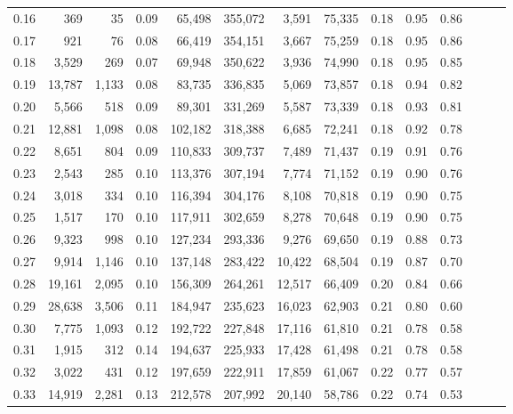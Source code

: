 \begin{tabular}{rrrrrrrrrrrrrr}
0.16 &     369 &     35 &  0.09 &   65,498 &  355,072 &   3,591 &  75,335 &  0.18 &  0.95 &      0.86 \\
0.17 &     921 &     76 &  0.08 &   66,419 &  354,151 &   3,667 &  75,259 &  0.18 &  0.95 &      0.86 \\
0.18 &   3,529 &    269 &  0.07 &   69,948 &  350,622 &   3,936 &  74,990 &  0.18 &  0.95 &      0.85 \\
0.19 &  13,787 &  1,133 &  0.08 &   83,735 &  336,835 &   5,069 &  73,857 &  0.18 &  0.94 &      0.82 \\
0.20 &   5,566 &    518 &  0.09 &   89,301 &  331,269 &   5,587 &  73,339 &  0.18 &  0.93 &      0.81 \\
0.21 &  12,881 &  1,098 &  0.08 &  102,182 &  318,388 &   6,685 &  72,241 &  0.18 &  0.92 &      0.78 \\
0.22 &   8,651 &    804 &  0.09 &  110,833 &  309,737 &   7,489 &  71,437 &  0.19 &  0.91 &      0.76 \\
0.23 &   2,543 &    285 &  0.10 &  113,376 &  307,194 &   7,774 &  71,152 &  0.19 &  0.90 &      0.76 \\
0.24 &   3,018 &    334 &  0.10 &  116,394 &  304,176 &   8,108 &  70,818 &  0.19 &  0.90 &      0.75 \\
0.25 &   1,517 &    170 &  0.10 &  117,911 &  302,659 &   8,278 &  70,648 &  0.19 &  0.90 &      0.75 \\
0.26 &   9,323 &    998 &  0.10 &  127,234 &  293,336 &   9,276 &  69,650 &  0.19 &  0.88 &      0.73 \\
0.27 &   9,914 &  1,146 &  0.10 &  137,148 &  283,422 &  10,422 &  68,504 &  0.19 &  0.87 &      0.70 \\
0.28 &  19,161 &  2,095 &  0.10 &  156,309 &  264,261 &  12,517 &  66,409 &  0.20 &  0.84 &      0.66 \\
0.29 &  28,638 &  3,506 &  0.11 &  184,947 &  235,623 &  16,023 &  62,903 &  0.21 &  0.80 &      0.60 \\
0.30 &   7,775 &  1,093 &  0.12 &  192,722 &  227,848 &  17,116 &  61,810 &  0.21 &  0.78 &      0.58 \\
0.31 &   1,915 &    312 &  0.14 &  194,637 &  225,933 &  17,428 &  61,498 &  0.21 &  0.78 &      0.58 \\
0.32 &   3,022 &    431 &  0.12 &  197,659 &  222,911 &  17,859 &  61,067 &  0.22 &  0.77 &      0.57 \\
0.33 &  14,919 &  2,281 &  0.13 &  212,578 &  207,992 &  20,140 &  58,786 &  0.22 &  0.74 &      0.53 \\

\end{tabular}
